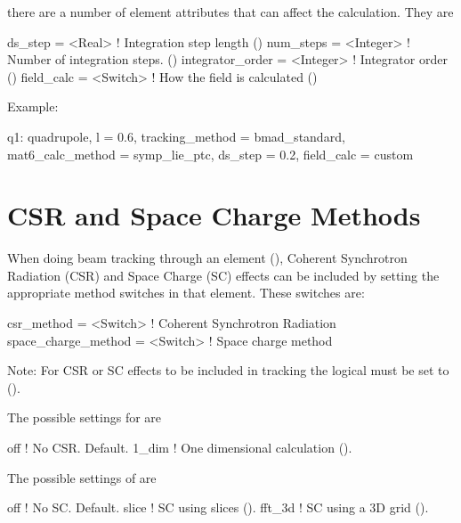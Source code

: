 there are a number of element attributes that can affect the calculation. They are
\begin{example}
  ds_step             = <Real>     ! Integration step length ()
  num_steps           = <Integer>  ! Number of integration steps. ()
  integrator_order    = <Integer>  ! Integrator order ()
  field_calc          = <Switch>   ! How the field is calculated ()
\end{example}

Example:
\begin{example}
  q1: quadrupole, l = 0.6, tracking_method = bmad_standard, 
        mat6_calc_method = symp_lie_ptc, ds_step = 0.2, field_calc = custom
\end{example}

\section{CSR and Space Charge Methods}
\label{s:csr.sc.meth}

When doing beam tracking through an element (), Coherent Synchrotron Radiation (CSR) and Space Charge (SC)
effects can be included by setting the appropriate method switches in that element. These switches are:
\begin{example}
  csr_method          = <Switch>   ! Coherent Synchrotron Radiation 
  space_charge_method = <Switch>   ! Space charge method
\end{example}
Note: For CSR or SC effects to be included in tracking the  logical  must be
set to  (). 

The possible settings for  are
\begin{example}
  off             ! No CSR. Default.
  1_dim           ! One dimensional calculation ().
\end{example}

The possible settings of  are
\begin{example}
  off             ! No SC. Default.
  slice           ! SC using slices ().
  fft_3d          ! SC using a 3D grid ().
\end{example}

